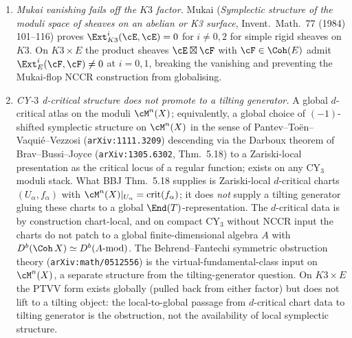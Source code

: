 \begin{proposition}
\begin{enumerate}[label=\emph{(\alph*)}, leftmargin=2.5em]
\item \emph{Mukai vanishing fails off the $K3$ factor.} Mukai
(\emph{Symplectic structure of the moduli space of sheaves on an
abelian or K3 surface}, Invent.\ Math.\ 77 (1984) 101--116) proves
$\Ext^i_{K3}(\cE, \cE) = 0$ for $i \neq 0, 2$ for simple rigid sheaves
on $K3$. On $K3 \times E$ the product sheaves $\cE \boxtimes \cF$ with
$\cF \in \Coh(E)$ admit $\Ext^i_{E}(\cF, \cF) \neq 0$ at $i = 0, 1$,
breaking the vanishing and preventing the Mukai-flop NCCR construction
from globalising.

\item \emph{CY-$3$ d-critical structure does not promote to a
tilting generator.} A global $d$-critical atlas on the moduli
$\cM^n(X)$; equivalently, a global choice of
$(-1)$-shifted symplectic structure on $\cM^n(X)$ in the sense of
Pantev--Toën--Vaquié--Vezzosi (\texttt{arXiv:1111.3209}) descending
via the Darboux theorem of Brav--Bussi--Joyce
(\texttt{arXiv:1305.6302}, Thm.~5.18) to a Zariski-local presentation
as the critical locus of a regular function; exists on any
CY$_3$ moduli stack. What BBJ Thm.~5.18 supplies is Zariski-local
$d$-critical charts $(U_\alpha, f_\alpha)$ with
$\cM^n(X)|_{U_\alpha} = \mathrm{crit}(f_\alpha)$; it does \emph{not}
supply a tilting generator gluing these charts to a global
$\End(T)$-representation. The $d$-critical data is by construction
chart-local, and on compact CY$_3$ without NCCR input the charts do
not patch to a global finite-dimensional algebra $A$ with
$D^b(\Coh\,X) \simeq D^b(A\text{-mod})$. The Behrend--Fantechi
symmetric obstruction theory (\texttt{arXiv:math/0512556}) is the
virtual-fundamental-class input on $\cM^n(X)$, a separate structure
from the tilting-generator question. On $K3 \times E$ the PTVV form
exists globally (pulled back from either factor) but does not lift to
a tilting object: the local-to-global passage from $d$-critical chart
data to tilting generator is the obstruction, not the availability of
local symplectic structure.
\end{enumerate}
\end{proposition}


